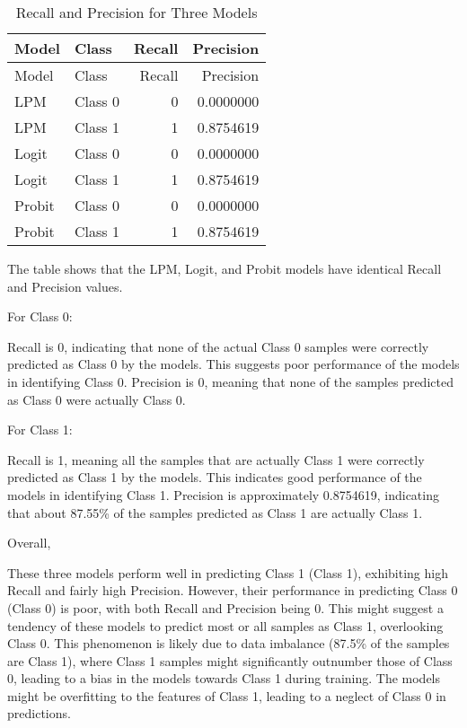 \documentclass[
]{article}
\begin{document}
\begin{longtable}[]{@{}llrr@{}}
\caption{Recall and Precision for Three Models}\tabularnewline
\toprule\noalign{}
Model & Class & Recall & Precision \\
\midrule\noalign{}
\endfirsthead
\toprule\noalign{}
Model & Class & Recall & Precision \\
\midrule\noalign{}
\endhead
\bottomrule\noalign{}
\endlastfoot
LPM & Class 0 & 0 & 0.0000000 \\
LPM & Class 1 & 1 & 0.8754619 \\
Logit & Class 0 & 0 & 0.0000000 \\
Logit & Class 1 & 1 & 0.8754619 \\
Probit & Class 0 & 0 & 0.0000000 \\
Probit & Class 1 & 1 & 0.8754619 \\
\end{longtable}

The table shows that the LPM, Logit, and Probit models have identical
Recall and Precision values.

For Class 0:

Recall is 0, indicating that none of the actual Class 0 samples were
correctly predicted as Class 0 by the models. This suggests poor
performance of the models in identifying Class 0. Precision is 0,
meaning that none of the samples predicted as Class 0 were actually
Class 0.

For Class 1:

Recall is 1, meaning all the samples that are actually Class 1 were
correctly predicted as Class 1 by the models. This indicates good
performance of the models in identifying Class 1. Precision is
approximately 0.8754619, indicating that about 87.55\% of the samples
predicted as Class 1 are actually Class 1.

Overall,

These three models perform well in predicting Class 1 (Class 1),
exhibiting high Recall and fairly high Precision. However, their
performance in predicting Class 0 (Class 0) is poor, with both Recall
and Precision being 0. This might suggest a tendency of these models to
predict most or all samples as Class 1, overlooking Class 0. This
phenomenon is likely due to data imbalance (87.5\% of the samples are
Class 1), where Class 1 samples might significantly outnumber those of
Class 0, leading to a bias in the models towards Class 1 during
training. The models might be overfitting to the features of Class 1,
leading to a neglect of Class 0 in predictions.
\end{document}
